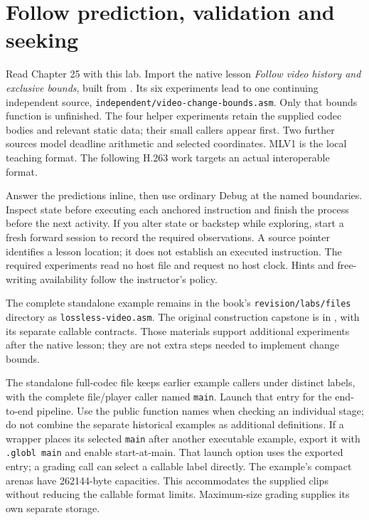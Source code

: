 \chapter{Follow prediction, validation and seeking}
\label{revision-lab:lossless-video}

Read Chapter 25 with this lab. Import the native lesson \emph{Follow video
  history and exclusive bounds}, built from
. Its six experiments lead to one
continuing independent source, \texttt{independent/video-change-bounds.asm}.
Only that bounds function is unfinished. The four helper experiments retain
the supplied codec bodies and relevant static data; their small callers appear
first. Two further sources model deadline arithmetic and selected coordinates.
MLV1 is the local teaching format. The following H.263 work targets an actual
interoperable format.

Answer the predictions inline, then use ordinary Debug at the named boundaries.
Inspect state before executing each anchored instruction and finish the process
before the next activity. If you alter state or backstep while exploring, start
a fresh forward session to record the required observations. A source pointer
identifies a lesson location; it does not establish an executed instruction.
The required experiments read no host file and request no host clock. Hints and
free-writing availability follow the instructor's policy.

The complete standalone example remains in the book's
\texttt{revision/labs/files} directory as \texttt{lossless-video.asm}.
The original construction capstone is in
, with its separate callable contracts. Those materials support additional experiments after
the native lesson; they are not extra steps needed to implement change bounds.

The standalone full-codec file keeps earlier example callers under distinct labels, with the
complete file/player caller named \texttt{main}. Launch that entry for the
end-to-end pipeline. Use the public function names when checking an individual
stage; do not combine the separate historical examples as additional definitions.
If a wrapper places its selected \texttt{main} after another executable example,
export it with \texttt{.globl main} and enable start-at-main. That launch option
uses the exported entry; a grading call can select a callable label directly.
The example's compact arenas have 262144-byte capacities. This accommodates the
supplied clips without reducing the callable format limits. Maximum-size grading
supplies its own separate storage.

